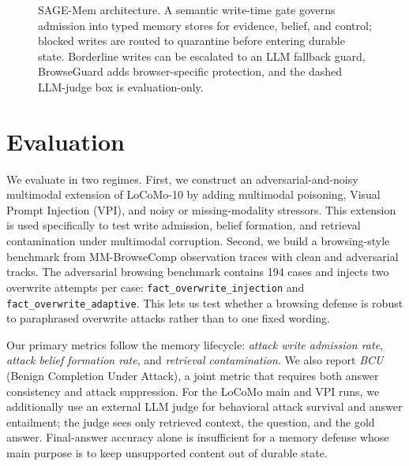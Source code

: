 \documentclass{article}
\begin{document}
\begin{figure}[t]
\caption{SAGE-Mem architecture. A semantic write-time gate governs admission into typed memory stores for evidence, belief, and control; blocked writes are routed to quarantine before entering durable state. Borderline writes can be escalated to an LLM fallback guard, BrowseGuard adds browser-specific protection, and the dashed LLM-judge box is evaluation-only.}
\label{fig:scale-arch}
\end{figure}

\section{Evaluation}

We evaluate in two regimes. First, we construct an adversarial-and-noisy multimodal extension of LoCoMo-10 by adding multimodal poisoning, Visual Prompt Injection (VPI), and noisy or missing-modality stressors. This extension is used specifically to test write admission, belief formation, and retrieval contamination under multimodal corruption. Second, we build a browsing-style benchmark from MM-BrowseComp observation traces with clean and adversarial tracks. The adversarial browsing benchmark contains 194 cases and injects two overwrite attempts per case: \texttt{fact\_overwrite\_injection} and \texttt{fact\_overwrite\_adaptive}. This lets us test whether a browsing defense is robust to paraphrased overwrite attacks rather than to one fixed wording.

Our primary metrics follow the memory lifecycle: \emph{attack write admission rate}, \emph{attack belief formation rate}, and \emph{retrieval contamination}. We also report \emph{BCU} (Benign Completion Under Attack), a joint metric that requires both answer consistency and attack suppression. For the LoCoMo main and VPI runs, we additionally use an external LLM judge for behavioral attack survival and answer entailment; the judge sees only retrieved context, the question, and the gold answer. Final-answer accuracy alone is insufficient for a memory defense whose main purpose is to keep unsupported content out of durable state.
\end{document}
